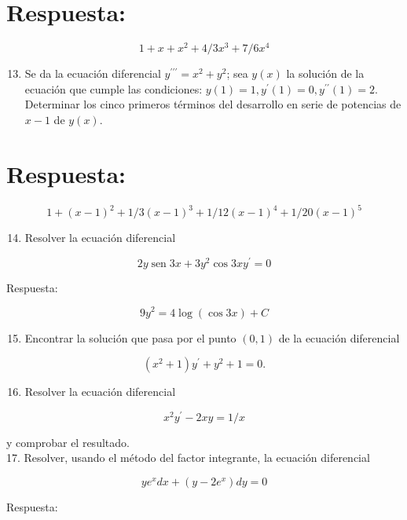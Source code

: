\documentclass[10pt]{article}
\theoremstyle{plain}
\theoremstyle{definition}
\theoremstyle{remark}
\begin{document}
\section*{Respuesta:}
$$
1+x+x^{2}+4 / 3 x^{3}+7 / 6 x^{4}
$$

\begin{enumerate}
  \setcounter{enumi}{12}
  \item Se da la ecuación diferencial $y^{\prime \prime \prime}=x^{2}+y^{2}$; sea $y(x)$ la solución de la ecuación que cumple las condiciones: $y(1)=1, y^{\prime}(1)=0, y^{\prime \prime}(1)=2$. Determinar los cinco primeros términos del desarrollo en serie de potencias de $x-1$ de $y(x)$.
\end{enumerate}

\section*{Respuesta:}
$$
1+(x-1)^{2}+1 / 3(x-1)^{3}+1 / 12(x-1)^{4}+1 / 20(x-1)^{5}
$$

\begin{enumerate}
  \setcounter{enumi}{13}
  \item Resolver la ecuación diferencial
\end{enumerate}

$$
2 y \operatorname{sen} 3 x+3 y^{2} \cos 3 x y^{\prime}=0
$$

Respuesta:

$$
9 y^{2}=4 \log (\cos 3 x)+C
$$

\begin{enumerate}
  \setcounter{enumi}{14}
  \item Encontrar la solución que pasa por el punto $(0,1)$ de la ecuación diferencial
\end{enumerate}

$$
\left(x^{2}+1\right) y^{\prime}+y^{2}+1=0 .
$$

\begin{enumerate}
  \setcounter{enumi}{15}
  \item Resolver la ecuación diferencial
\end{enumerate}

$$
x^{2} y^{\prime}-2 x y=1 / x
$$

y comprobar el resultado.\\
17. Resolver, usando el método del factor integrante, la ecuación diferencial

$$
y e^{x} d x+\left(y-2 e^{x}\right) d y=0
$$

Respuesta:
\end{document}
